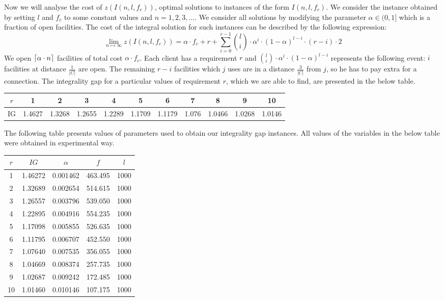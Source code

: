 \documentclass{llncs}
\DeclarePairedDelimiter{\ceil}{\lceil}{\rceil}
\begin{document}
Now we will analyse the cost of $z(I(n, l, f_c))$, optimal solutions to instances of the form $I(n, l, f_c)$. We consider the instance obtained by setting $l$ and $f_c$ to some constant values and $n = 1, 2, 3, \dots$. We consider all solutions by modifying the parameter $\alpha \in (0, 1]$ which is a fraction of open facilities. The cost of the integral solution for such instances can be described by the following expression: $$\lim_{n \mapsto \infty}z(I(n, l, f_c)) = \alpha \cdot f_c + r + \sum_{i = 0}^{r-1} \binom{l}{i} \cdot \alpha^i \cdot (1 - \alpha)^{l-i} \cdot (r - i) \cdot 2$$ We open $\ceil{\alpha \cdot n}$ facilities of total cost $\alpha \cdot f_c$. Each client has a requirement $r$ and $\binom{l}{i} \cdot \alpha^i \cdot (1 - \alpha)^{l-i}$ represents the following event: $i$ facilities at distance $\frac{1}{|C|}$ are open. The remaining $r - i$  facilities which $j$ uses are in a distance $\frac{3}{|C|}$ from $j$, so he has to pay extra for a connection. The integrality gap for a particular 
values of requirement $r$, which we are able to find, are presented in the below table.

\begin{center}
  \begin{tabular}{ c | c | c | c | c | c | c | c | c | c | c }
    $r$ & 1 & 2 & 3 & 4 & 5 & 6 & 7 & 8 & 9 & 10\\ \hline
    IG & 1.4627 & 1.3268 & 1.2655 & 1.2289 & 1.1709 & 1.1179 & 1.076 & 1.0466 & 1.0268 & 1.0146 \\
  \end{tabular}
\end{center}

The following table presents values of parameters used to obtain our integrality gap instances. All values of the variables in the below table were obtained in experimental way.
\begin{center}
  \begin{tabular}{ c | c | c | c | c }
    $r$ & $IG$ & $\alpha$ & $f$ & $l$ \\ \hline
    1  & 1.46272 & 0.001462 & 463.495 & 1000 \\ \hline
    2  & 1.32689 & 0.002654 & 514.615 & 1000 \\ \hline
    3  & 1.26557 & 0.003796 & 539.050 & 1000 \\ \hline
    4  & 1.22895 & 0.004916 & 554.235 & 1000 \\ \hline 
    5  & 1.17098 & 0.005855 & 526.635 & 1000 \\ \hline
    6  & 1.11795 & 0.006707 & 452.550 & 1000 \\ \hline
    7  & 1.07640 & 0.007535 & 356.055 & 1000 \\ \hline
    8  & 1.04669 & 0.008374 & 257.735 & 1000 \\ \hline
    9  & 1.02687 & 0.009242 & 172.485 & 1000 \\ \hline
    10 & 1.01460 & 0.010146 & 107.175 & 1000 \\
  \end{tabular}
\end{center}
\end{document}
